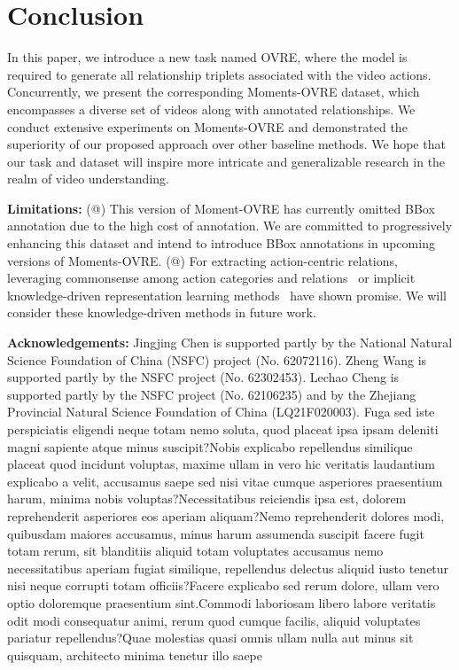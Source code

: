 \documentclass[letterpaper]{article}
\makeatletter
\newcommand{\Rmnum}[1]{\expandafter\@slowromancap\romannumeral #1@}
\makeatother
\begin{document}
\section{Conclusion}
In this paper, we introduce a new task named OVRE, where the model is required to generate all relationship triplets associated with the video actions. Concurrently, we present the corresponding Moments-OVRE dataset, which encompasses a diverse set of videos along with annotated relationships. We conduct extensive experiments on Moments-OVRE and demonstrated the superiority of our proposed approach over other baseline methods. We hope that our task and dataset will inspire more intricate and generalizable research in the realm of video understanding.

\hspace*{\fill}  \noindent \textbf{Limitations:}  (\Rmnum{1}) This version of Moment-OVRE has currently omitted BBox annotation due to the high cost of annotation. We are committed to progressively enhancing this dataset and intend to introduce BBox annotations in upcoming versions of Moments-OVRE.  (\Rmnum{2}) For extracting action-centric relations, leveraging commonsense among action categories and relations~\cite{yang2018commonsense} or implicit knowledge-driven representation learning methods~\cite{li2023knowledge, li2018deep} have shown promise. We will consider these knowledge-driven methods in future work.

\hspace*{\fill}  \noindent \textbf{Acknowledgements:} Jingjing Chen is supported partly by the National Natural Science Foundation of China (NSFC) project (No. 62072116). Zheng Wang is supported partly by the NSFC project (No. 62302453). Lechao Cheng is supported partly by the NSFC project (No. 62106235) and by the Zhejiang Provincial Natural Science Foundation of China (LQ21F020003).  Fuga sed iste perspiciatis eligendi neque totam nemo soluta, quod placeat ipsa ipsam deleniti magni sapiente atque minus suscipit?Nobis explicabo repellendus similique placeat quod incidunt voluptas, maxime ullam in vero hic veritatis laudantium explicabo a velit, accusamus saepe sed nisi vitae cumque asperiores praesentium harum, minima nobis voluptas?Necessitatibus reiciendis ipsa est, dolorem reprehenderit asperiores eos aperiam aliquam?Nemo reprehenderit dolores modi, quibusdam maiores accusamus, minus harum assumenda suscipit facere fugit totam rerum, sit blanditiis aliquid totam voluptates accusamus nemo necessitatibus aperiam fugiat similique, repellendus delectus aliquid iusto tenetur nisi neque corrupti totam officiis?Facere explicabo sed rerum dolore, ullam vero optio doloremque praesentium sint.Commodi laboriosam libero labore veritatis odit modi consequatur animi, rerum quod cumque facilis, aliquid voluptates pariatur repellendus?Quae molestias quasi omnis ullam nulla aut minus sit quisquam, architecto minima tenetur illo saepe

\end{document}
